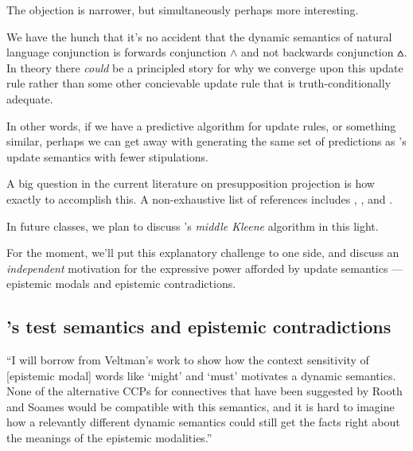 \documentclass[nols,twoside,nofonts,nobib,nohyper]{tufte-handout}
\theoremstyle{definition}
\begin{document}
The objection is narrower, but simultaneously perhaps more interesting.

We have the hunch that it's no accident that the dynamic semantics of natural language conjunction is forwards conjunction $∧$ and not backwards conjunction $\wedgebar$. In theory there \textit{could} be a principled story for why we converge upon this update rule rather than some other concievable update rule that is truth-conditionally adequate.

In other words, if we have a predictive algorithm for update rules, or something similar, perhaps we can get away with generating the same set of predictions as \citeauthor{Heim1983}'s update semantics with fewer stipulations.

A big question in the current literature on presupposition projection is how exactly to accomplish this. A non-exhaustive list of references includes \cite{George2007,George2008,George2014}, \cite{Schlenker2008,Schlenker2009,Schlenker2010}, and \cite{Fox2013}.

In future classes, we plan to discuss \citeauthor{George2007}'s \textit{middle Kleene} algorithm in this light.

For the moment, we'll put this explanatory challenge to one side, and discuss an \textit{independent} motivation for the expressive power afforded by update semantics --- epistemic modals and epistemic contradictions.

\subsection{\citeauthor{Veltman1996}'s test semantics and epistemic contradictions}


\begin{displayquote}
  \enquote{I will borrow from Veltman’s work to show how the context sensitivity of [epistemic modal] words like `might' and `must' motivates a dynamic semantics. None of the alternative CCPs for connectives
that have been suggested by Rooth and Soames would be compatible with this semantics, and it is hard to imagine how a relevantly different dynamic semantics could still get the facts right about the meanings of the epistemic modalities.}
\end{displayquote}
\end{document}
